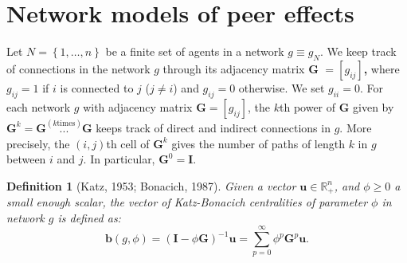 \documentclass[nojss]{jss}
\newtheorem{definition}{Definition}
\begin{document}
	
	\section{Network models of peer effects} \label{sec:models}
	Let $N=\left\{ 1,\ldots ,n\right\} $ be a finite set of agents in a network $g\equiv g_{N}.$ We keep track of connections in the network $g$ through its adjacency matrix $\boldsymbol{G}$ $=[g_{ij}]$\textbf{,} where $g_{ij}=1$ if $ i$ is connected to $j$ ($j\neq i$) and $g_{ij}=0$ otherwise. We set $g_{ii}=0$. For each network $g$ with adjacency matrix $\boldsymbol{G}=[g_{ij}]$, the $k$th power of $\boldsymbol{G}$ given by $\boldsymbol{G}^{k}= \boldsymbol{G}\overset{(k\text{times})}{\boldsymbol{...}}\boldsymbol{G}$ keeps track of direct and indirect connections in $g$. More precisely, the $(i,j)$th cell of $\boldsymbol{G}^{k}$ gives the number of paths of length $k$ in $g$ between $i$ and $j$. In particular, $\boldsymbol{G}^{0}=\boldsymbol{I}$.
	
	\begin{definition}[Katz, 1953; Bonacich, 1987] \label{Def1}
		Given a vector $\boldsymbol{u}\in \mathbb{R}_{+}^{n}$, and $\phi\geq 0$ a small enough scalar, the vector of Katz-Bonacich centralities of parameter $\phi$ in network $g$ is defined as: 
		\begin{equation}
		\boldsymbol{b}\left( g,\phi \right) =\left( \boldsymbol{I}-\phi \boldsymbol{G}\right) ^{-1}\boldsymbol{u=}\sum\limits_{p=0}^{\infty}\phi ^{p}%
		\boldsymbol{G}^{p}\boldsymbol{u}.  
		\label{KB}
		\end{equation}
	\end{definition}
	
\end{document}
